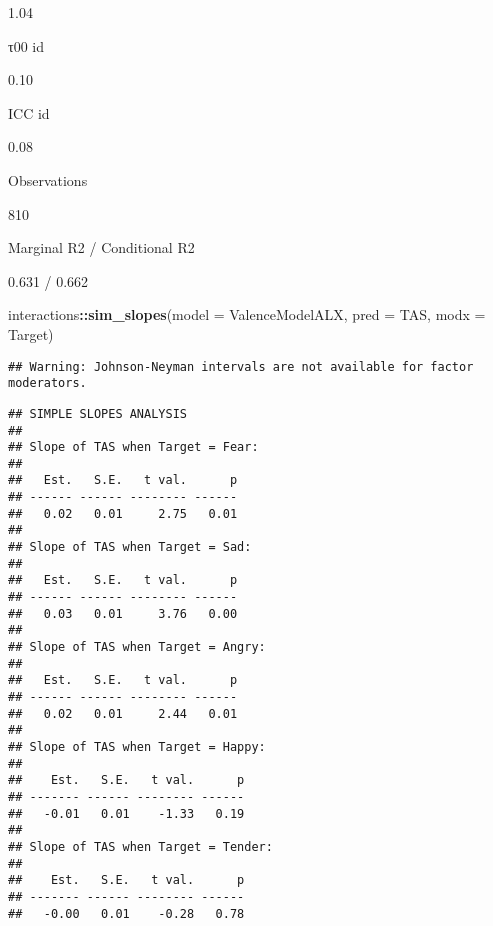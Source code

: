 \documentclass[]{article}
\newenvironment{Shaded}{\begin{snugshade}}{\end{snugshade}}
\newcommand{\DataTypeTok}[1]{\textcolor[rgb]{0.13,0.29,0.53}{#1}}
\newcommand{\KeywordTok}[1]{\textcolor[rgb]{0.13,0.29,0.53}{\textbf{#1}}}
\newcommand{\NormalTok}[1]{#1}
\newcommand{\OperatorTok}[1]{\textcolor[rgb]{0.81,0.36,0.00}{\textbf{#1}}}
\begin{document}
1.04

τ00 id

0.10

ICC id

0.08

Observations

810

Marginal R2 / Conditional R2

0.631 / 0.662

\begin{Shaded}
\begin{Highlighting}[]
\NormalTok{interactions}\OperatorTok{::}\KeywordTok{sim_slopes}\NormalTok{(}\DataTypeTok{model =}\NormalTok{ ValenceModelALX, }\DataTypeTok{pred =}\NormalTok{ TAS, }\DataTypeTok{modx =}\NormalTok{ Target)}
\end{Highlighting}
\end{Shaded}

\begin{verbatim}
## Warning: Johnson-Neyman intervals are not available for factor moderators.
\end{verbatim}

\begin{verbatim}
## SIMPLE SLOPES ANALYSIS 
## 
## Slope of TAS when Target = Fear: 
## 
##   Est.   S.E.   t val.      p
## ------ ------ -------- ------
##   0.02   0.01     2.75   0.01
## 
## Slope of TAS when Target = Sad: 
## 
##   Est.   S.E.   t val.      p
## ------ ------ -------- ------
##   0.03   0.01     3.76   0.00
## 
## Slope of TAS when Target = Angry: 
## 
##   Est.   S.E.   t val.      p
## ------ ------ -------- ------
##   0.02   0.01     2.44   0.01
## 
## Slope of TAS when Target = Happy: 
## 
##    Est.   S.E.   t val.      p
## ------- ------ -------- ------
##   -0.01   0.01    -1.33   0.19
## 
## Slope of TAS when Target = Tender: 
## 
##    Est.   S.E.   t val.      p
## ------- ------ -------- ------
##   -0.00   0.01    -0.28   0.78
\end{verbatim}
\end{document}
